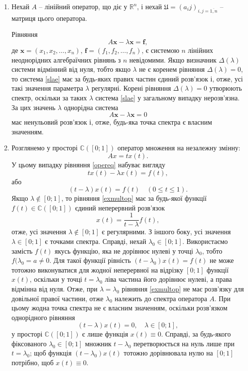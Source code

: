 \documentclass[14pt,twoside]{extreport}
\theoremstyle{mystyle}
\numberwithin{equation}{chapter}
\begin{document}
\begin{enumerate}
	\item Нехай $A$ -- лінійний оператор, що діє у $\mathbb{R}^n$, і нехай $\mathfrak{U} = (a_ij)_{i,j = \overline{1, n}}$ -- матриця цього оператора.
	
	Рівняння
	\begin{equation}\label{slae}
	A\mathbf{x} - \lambda \mathbf{x} = \mathbf{f},
	\end{equation}
	де $\mathbf{x} = (x_1, x_2, \ldots, x_n)$, $\mathbf{f} = (f_1, f_2, \ldots, f_n)$, є системою $n$ лінійних неоднорідних алгебраїчних рівнянь з $n$ невідомими. Якщо визначник $\Delta (\lambda)$ системи відмінний від нуля, тобто якщо $\lambda$ не є коренем рівняння $\Delta(\lambda) = 0$, то система \eqref{slae} має за будь-яких правих частин єдиний розв'язок і, отже, усі такі значення параметра $\lambda$ регулярні. Корені рівняння $\Delta(\lambda) = 0$ утворюють спектр, оскільки за таких $\lambda$ система \eqref{slae} у загальному випадку нерозв'язна.  За цих значень $\lambda$ однорідна система
	\[
	A\mathbf{x} - \lambda \mathbf{x} = 0
	\]
	має ненульовий розв'язок і, отже, будь-яка точка спектра є власним значенням.
	\item Розглянемо у просторі $\mathbb{C}([0; 1])$ оператор множення на незалежну змінну:
	\[
	Ax = tx(t).
	\]
	У цьому випадку рівняння \eqref{opereq} набуває вигляду
	\[
	tx(t) - \lambda x(t) =f(t),
	\]
	або
	\begin{equation}\label{exmultop}
	(t-\lambda) x(t) = f(t) \quad (0 \leqslant t \leqslant 1).
	\end{equation}
	Якщо $\lambda \notin [0; 1]$, то рівняння \eqref{exmultop} має за будь-якої функції $f(t) \in \mathbb{C}([0; 1])$  єдиний неперервний розв'язок
	\[
	x(t) = \dfrac{1}{t-\lambda} f(t),
	\]
	отже, усі значення $\lambda \notin [0; 1]$ є регулярними.
	З іншого боку, усі значення $\lambda \in [0; 1]$ є точками спектра. Справді, нехай $\lambda_0 \in [0; 1]$. Використаємо замість $f(t)$ якусь функцію, яка не дорівнює нулеві у точці $\lambda_0$, тобто $f(\lambda_0 = a \neq 0$. Для такої функції рівність $(t- \lambda_0) x(t) = f(t)$ не може тотожно виконуватися для жодної неперервної на відрізку $[0; 1]$ функції $x(t)$, оскільки у точці $t = \lambda_0$ ліва частина його дорівнює нулеві, а права відмінна від нуля. Отже, при $\lambda = \lambda_0$ рівняння \eqref{exmultop} не має розв'язку для довільної правої частини, отже $\lambda_0$ належить до спектра оператора $A$. При цьому жодна точка спектра не є власним значенням, оскільки розв'язком однорідного рівняння
  \[
  (t-\lambda) x(t) = 0, \quad \lambda \in [0; 1],
  \]
у просторі $\mathbb{C}([0; 1])$ є лише функція $x(t) \equiv 0$. Справді, за будь-якого фіксованого $\lambda_0 \in [0; 1]$ множник $t - \lambda_0$ перетворюється на нуль лише при $t = \lambda_0$; щоб функція $(t-\lambda_0)x(t)$ тотожно дорівнювала нулю на $[0; 1]$ потрібно, щоб $x(t) \equiv 0$.
\end{enumerate}
\end{document}
